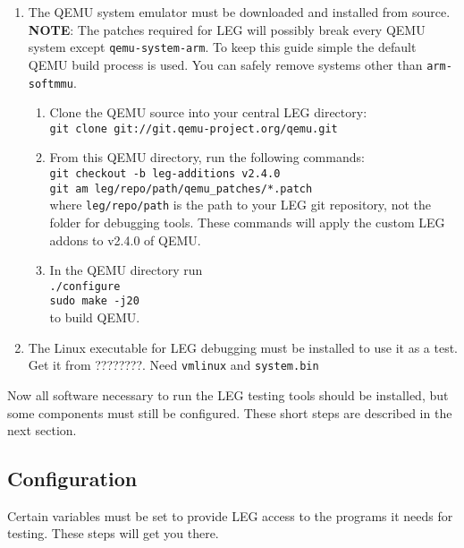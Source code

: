 \begin{enumerate}
\item The QEMU system emulator must be downloaded and installed from source. 
\textbf{NOTE}: The patches required for LEG will possibly break every QEMU system except \texttt{qemu-system-arm}. 
To keep this guide simple the default QEMU build process is used. 
You can safely remove systems other than \texttt{arm-softmmu}.
	\begin{enumerate}
	\item Clone the QEMU source into your central LEG directory: \\\texttt{git clone git://git.qemu-project.org/qemu.git}
	\item From this QEMU directory, run the following commands: \\\texttt{git checkout -b leg-additions v2.4.0 \\ git am leg/repo/path/qemu\_patches/*.patch}\\
	where \texttt{leg/repo/path} is the path to your LEG git repository, not the folder for debugging tools.
	These commands will apply the custom LEG addons to v2.4.0 of QEMU.
	\item In the QEMU directory run \\\texttt{./configure \\ sudo make -j20}\\ to build QEMU.
	\end{enumerate}
	
\item The Linux executable for LEG debugging must be installed to use it as a test.
Get it from  ????????.
Need \texttt{vmlinux} and \texttt{system.bin}
\end{enumerate}

Now all software necessary to run the LEG testing tools should be installed, but some components must still be configured.
These short steps are described in the next section.

\subsection{Configuration}\label{sec:cfg}

Certain variables must be set to provide LEG access to the programs it needs for testing.
These steps will get you there.

